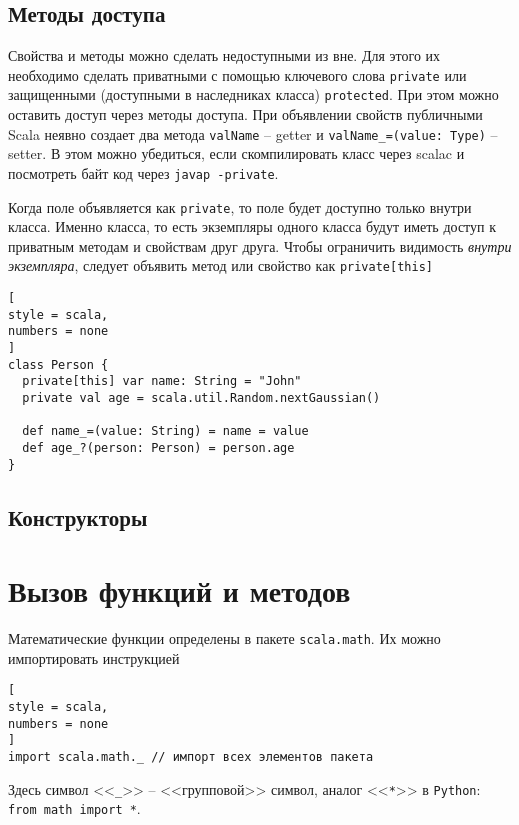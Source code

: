 \documentclass[%
	11pt,
	a4paper,
	utf8,
		]{article}
\begin{document}
\subsection{Методы доступа}

Свойства и методы можно сделать недоступными из вне. Для этого их необходимо сделать приватными с помощью ключевого слова \texttt{private} или защищенными (доступными в наследниках класса) \texttt{protected}. При этом можно оставить доступ через методы доступа. При объявлении свойств публичными Scala неявно создает два метода \texttt{valName} -- getter и \texttt{valName\_=(value: Type)} -- setter. В этом можно убедиться, если скомпилировать класс через scalac и посмотреть байт код через \texttt{javap -private}.

Когда поле объявляется как \texttt{private}, то поле будет доступно только внутри класса. Именно класса, то есть экземпляры одного класса будут иметь доступ к приватным методам и свойствам друг друга. Чтобы ограничить видимость \emph{внутри экземпляра}, следует объявить метод или свойство как \texttt{private[this]}
\begin{lstlisting}[
style = scala,
numbers = none
]
class Person {
  private[this] var name: String = "John"
  private val age = scala.util.Random.nextGaussian()
  
  def name_=(value: String) = name = value
  def age_?(person: Person) = person.age
}
\end{lstlisting}

\subsection{Конструкторы}










\section{Вызов функций и методов}

Математические функции определены в пакете \texttt{scala.math}. Их можно импортировать инструкцией

\begin{lstlisting}[
style = scala,
numbers = none
]
import scala.math._ // импорт всех элементов пакета
\end{lstlisting}

Здесь символ <<\verb|_|>> -- <<групповой>> символ, аналог <<\verb|*|>> в \texttt{Python}: \lstinline{from math import *}.
\end{document}
